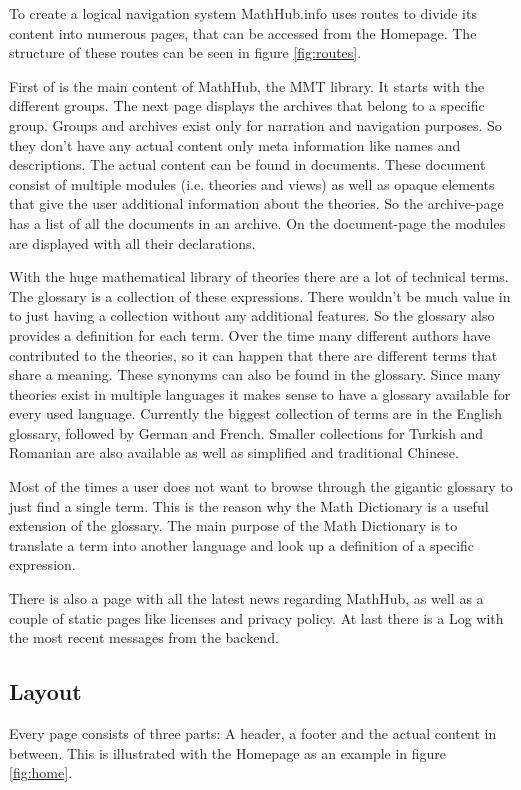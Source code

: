 \documentclass[11pt,a4paper]{article}
\begin{document}
To create a logical navigation system MathHub.info uses routes to divide its content into numerous pages, that can be accessed from the Homepage.
The structure of these routes can be seen in figure \ref{fig:routes}.

First of is the main content of MathHub, the MMT library.
It starts with the different groups.
The next page displays the archives that belong to a specific group.
Groups and archives exist only for narration and navigation purposes.
So they don't have any actual content only meta information like names and descriptions.
The actual content can be found in documents.
These document consist of multiple modules (i.e. theories and views) as well as opaque elements that give the user additional information about the theories.
So the archive-page has a list of all the documents in an archive.
On the document-page the modules are displayed with all their declarations.

With the huge mathematical library of theories there are a lot of technical terms.
The glossary is a collection of these expressions.
There wouldn't be much value in to just having a collection without any additional features.
So the glossary also provides a definition for each term.
Over the time many different authors have contributed to the theories, so it can happen that there are different terms that share a meaning.
These synonyms can also be found in the glossary.
Since many theories exist in multiple languages it makes sense to have a glossary available for every used language.
Currently the biggest collection of terms are in the English glossary, followed by German and French.
Smaller collections for Turkish and Romanian are also available as well as simplified and traditional Chinese.\cite{smglom}

Most of the times a user does not want to browse through the gigantic glossary to just find a single term.
This is the reason why the Math Dictionary is a useful extension of the glossary.
The main purpose of the Math Dictionary is to translate a term into another language and look up a definition of a specific expression.

There is also a page with all the latest news regarding MathHub, as well as a couple of static pages like licenses and privacy policy.
At last there is a Log with the most recent messages from the backend.

\subsection{Layout}
Every page consists of three parts: A header, a footer and the actual content in between.
This is illustrated with the Homepage as an example in figure \ref{fig:home}.
\end{document}
